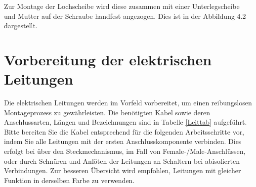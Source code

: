 Zur Montage der Lochscheibe wird diese zusammen mit einer Unterlegscheibe und Mutter auf der Schraube handfest angezogen. Dies ist in der Abbildung 4.2 dargestellt.



\section{Vorbereitung der elektrischen Leitungen}

Die elektrischen Leitungen werden im Vorfeld vorbereitet, um einen reibungslosen Montageprozess zu gewährleisten. Die benötigten Kabel sowie deren Anschlussarten, Längen und Bezeichnungen sind in Tabelle \ref{Leittab} aufgeführt. Bitte bereiten Sie die Kabel entsprechend für die folgenden Arbeitsschritte vor, indem Sie alle Leitungen mit der ersten Anschlusskomponente verbinden. Dies erfolgt bei über den Steckmechanismus, im Fall von Female-/Male-Anschlüssen, oder durch Schnüren und Anlöten der Leitungen an Schaltern bei abisolierten Verbindungen. Zur besseren Übersicht wird empfohlen, Leitungen mit gleicher Funktion in derselben Farbe zu verwenden.



